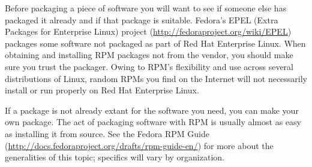 Before packaging a piece of software you will want to see if someone else
has packaged it already and if that package is suitable. Fedora's EPEL
(Extra Packages for Enterprise Linux) project
(\url{http://fedoraproject.org/wiki/EPEL}) packages some software not
packaged as part of Red Hat Enterprise Linux. When obtaining and
installing RPM packages not from the vendor, you should make sure you
trust the packager. Owing to RPM's flexibility and use across several
distributions of Linux, random RPMs you find on the Internet will not
necessarily install or run properly on Red Hat Enterprise Linux.

If a package is not already extant for the software you need, you can make
your own package. The act of packaging software with RPM is usually almost
as easy as installing it from source. See the Fedora RPM Guide
(\url{http://docs.fedoraproject.org/drafts/rpm-guide-en/}) for more about
the generalities of this topic; specifics will vary by organization.



